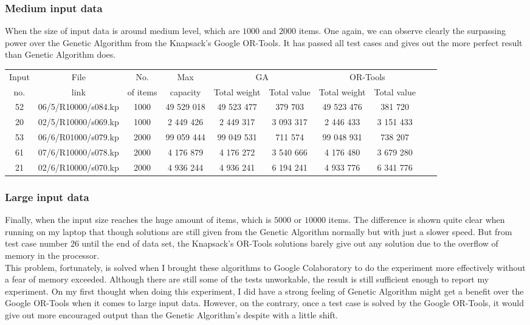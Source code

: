 \documentclass{article}
\begin{document}
\subsubsection{Medium input data}
When the size of input data is around medium level, which are $1000$ and $2000$ items. One again, we can observe clearly the surpassing power over the Genetic Algorithm from the Knapsack's Google OR-Tools. It has passed all test cases and gives out the more perfect result than Genetic Algorithm does.
    \begin{center}
        \begin{tabular}{|c|c| c|c| c|c| c|c| c|c|}
        \hline
            Input& File& No. & Max& \multicolumn{2}{c|}{GA} & \multicolumn{2}{c|}{OR-Tools}\\
            no.&link& of items &capacity& Total weight & Total value & Total weight & Total value\\
        \hline
            52 & 06/5/R10000/s084.kp & 1000 & 49 529 018 & 49 523 477 & 379 703 & 49 523 476 & 381 720\\
            20 & 02/5/R10000/s069.kp & 1000 & 2 449 426 & 2 449 317 & 3 093 317 & 2 446 433 & 3 151 433\\
            53 & 06/6/R01000/s079.kp & 2000 & 99 059 444 & 99 049 531 & 711 574 & 99 048 931 & 738 207\\
            61 & 07/6/R10000/s078.kp & 2000 & 4 176 879 & 4 176 272 & 3 540 666 & 4 176 480 & 3 679 280\\
            21 & 02/6/R10000/s070.kp & 2000 & 4 936 244 & 4 936 241 & 6 194 241 & 4 933 776 & 6 341 776\\
        \hline
        \hline 
        \end{tabular}
    \end{center}
\subsubsection{Large input data}
Finally, when the input size reaches the huge amount of items, which is $5000$ or $10 000$ items. The difference is shown quite clear when running on my laptop that though solutions are still given from the Genetic Algorithm normally but with just a slower speed. But from test case number 26 until the end of data set, the Knapsack's OR-Tools solutions barely give out any solution due to the overflow of memory in the processor.\\

This problem, fortunately, is solved when I brought these algorithms to Google Colaboratory to do the experiment more effectively without a fear of memory exceeded. Although there are still some of the tests unworkable, the result is still sufficient enough to report my experiment. On my first thought when doing this experiment, I did have a strong feeling of Genetic Algorithm might get a benefit over the Google OR-Tools when it comes to large input data. However, on the contrary, once a test case is solved by the Google OR-Tools, it would give out more encouraged output than the Genetic Algorithm's despite with a little shift. \\
\end{document}
